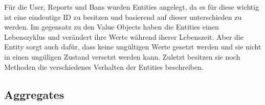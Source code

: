 



Für die User, Reports und Bans wurden Entities angelegt,
da es für diese wichtig ist eine eindeutige ID zu besitzen und basierend auf dieser unterschieden zu werden.
Im gegensatz zu den Value Objects haben die Entities einen Lebenszyklus und verändert ihre Werte während iherer Lebenszeit.
Aber die Entity sorgt auch dafür, dass keine ungültigen Werte gesetzt werden und sie nicht in einen ungüligen Zustand versetzt werden kann.
Zuletzt besitzen sie noch Methoden die verschiedenes Verhalten der Entities beschreiben.

\subsection{Aggregates}

